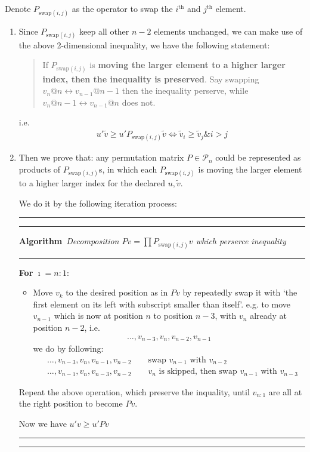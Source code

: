 \documentclass[11pt,a4paper]{ctexart}
\numberwithin{equation}{section}%
\newenvironment{algorithm}[1]{\vspace{12pt} \hrule\hrule \vspace{3pt} \noindent\textbf{\color[HTML]{E63F00}Algorithm } \,\textit{#1} \vspace{3pt} \hrule\vspace{6pt}
}{\vspace{6pt}\hrule\hrule \vspace{12pt}} %
\begin{document}
\subsection{}
Denote $ P_{\mathrm{ swap }(i,j) } $ as the operator to swap the $ i^\mathrm{ th }  $ and $ j^\mathrm{ th }  $ element. 
\begin{enumerate}[topsep=2pt,itemsep=2pt]
    \item Since $ P_{\mathrm{ swap }(i,j) } $ keep all other $ n-2 $ elements unchanged, we can make use of the above 2-dimensional inequality, we have the following statement:  
    \begin{quote}
        If $ P_{\mathrm{ swap }(i,j) } $ is \textbf{moving the larger element to a higher larger index, then the inequality is preserved}. Say swapping $ v_n@ n \leftrightarrow v_{n-1}@ n-1 $ then the inequality perserve, while $ v_n@n-1 \leftrightarrow v_{n-1}@n $ does not.
    \end{quote}
    i.e.
    \begin{align*}
        u' \tilde{v}\geq u'P_{\mathrm{ swap }(i,j)}\tilde{v}\Leftrightarrow \tilde{v}_i\geq \tilde{v}_j \& i>j
    \end{align*}
    \item Then we prove that: any permutation matrix $ P\in\mathcal{P}_n $ could be represented as products of $ P_{\mathrm{ swap }(i,j) } $s, in which each $ P_{\mathrm{ swap }(i,j) } $ is moving the larger element to a higher larger index for the declared $ u,\tilde{v} $.
    
    We do it by the following iteration process:
    \begin{algorithm}{Decomposition $ Pv = \prod P_{\mathrm{ swap }(i,j) } v $ which perserce inequality}
        \textbf{For} $ \imath = n:1 $:
        \begin{itemize}[topsep=2pt,itemsep=2pt]
            \item Move $ v_k $ to the desired position as in $ Pv $ by repeatedly swap it with `the first element on its left with subscript smaller than itself'. e.g. to move $ v_{n-1} $ which is now at position $ n $ to position $ n-3 $, with $ v_{n} $ already at position $ n-2 $, i.e.
            \begin{align*}
                \ldots, v_{n-3}, v_n , v_{n-2}, v_{n-1}
            \end{align*}
            we do by following:
            \begin{align*}
                &\ldots, v_{n-3}, v_n , v_{n-1}, v_{n-2}\qquad \text{swap } v_{n-1} \text{ with } v_{n-2}\\
                &\ldots, v_{n-1}, v_n , v_{n-3}, v_{n-2}\qquad v_n \text{ is skipped, then swap } v_{n-1} \text{ with } v_{n-3}
            \end{align*}
        \end{itemize}
        Repeat the above operation, which preserve the inquality, until $ v_{n:1} $ are all at the right position to become $ Pv $.

        Now we have $ u'v\geq u'Pv $
            
    \end{algorithm}
\end{enumerate}
\end{document}
